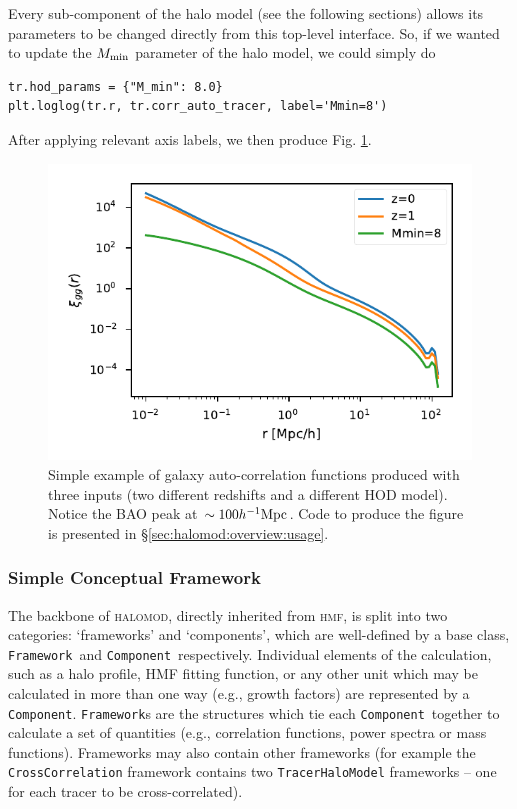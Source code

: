 \documentclass[5p,aas_macros]{elsarticle}
\newcommand{\framework}{\texttt{Framework}}
\newcommand{\component}{\texttt{Component}}
\begin{document}
Every sub-component of the halo model (see the following sections) allows its parameters to be changed directly from this top-level interface. So, if we wanted to update the $M_{\rm min}$ parameter of the halo model, we could simply do
\begin{verbatim}
tr.hod_params = {"M_min": 8.0}
plt.loglog(tr.r, tr.corr_auto_tracer, label='Mmin=8')
\end{verbatim}
After applying relevant axis labels, we then produce Fig. \ref{fig:toy_example}.

\begin{figure}
    \centering
    \includegraphics[width=\linewidth,trim={0 0.2cm 0 0},clip=true]{figures/toy_example.pdf}
    \caption{Simple example of galaxy auto-correlation functions produced with three inputs (two different redshifts and a different HOD model).
    Notice the BAO peak at $\sim100 h^{-1}{\rm Mpc}$. Code to produce the figure is presented in \S\ref{sec:halomod:overview:usage}.}
    \label{fig:toy_example}
\end{figure}

\subsubsection{Simple Conceptual Framework}
\label{sec:halomod:overview:concept}
The backbone of \textsc{halomod}, directly inherited from \textsc{hmf}, is split into two categories: `frameworks' and `components', which are well-defined by a base class, \framework\ and \component\ respectively. Individual elements of the calculation, such as a halo profile, HMF fitting function, or any other unit which may be calculated in more than one way (e.g., growth factors) are represented by a \component. \texttt{Framework}s are the structures which tie each \component\ together to calculate a set of quantities (e.g., correlation functions, power spectra or mass functions). Frameworks may also contain other frameworks (for example the \texttt{Cross\-Correlation} framework contains two \texttt{TracerHaloModel} frameworks -- one for each tracer to be cross-correlated).
\end{document}
